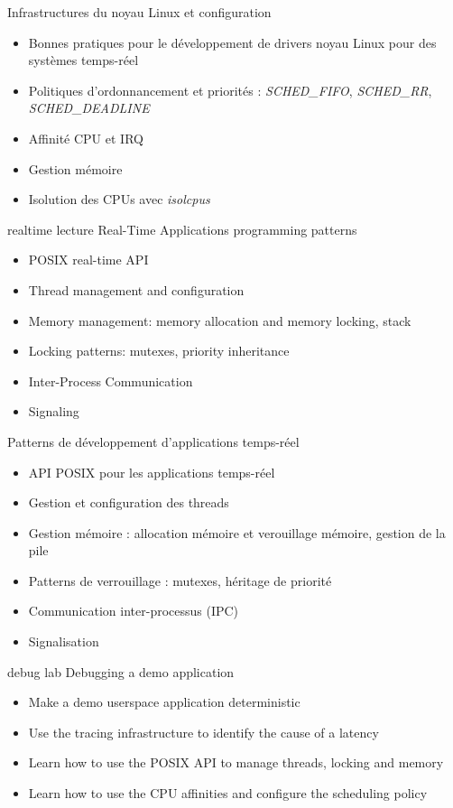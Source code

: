 {Infrastructures du noyau Linux et configuration}
{
  \begin{itemize}
  \item Bonnes pratiques pour le développement de drivers noyau Linux
    pour des systèmes temps-réel
  \item Politiques d'ordonnancement et priorités : {\em SCHED\_FIFO},
    {\em SCHED\_RR}, {\em SCHED\_DEADLINE}
  \item Affinité CPU et IRQ
  \item Gestion mémoire
  \item Isolution des CPUs avec {\em isolcpus}
  \end{itemize}
}
{realtime}
{lecture}
{Real-Time Applications programming patterns}
{
  \begin{itemize}
  \item POSIX real-time API
  \item Thread management and configuration
  \item Memory management: memory allocation and memory locking, stack
  \item Locking patterns: mutexes, priority inheritance
  \item Inter-Process Communication
  \item Signaling
  \end{itemize}
}
{Patterns de développement d'applications temps-réel}
{
  \begin{itemize}
  \item API POSIX pour les applications temps-réel
  \item Gestion et configuration des threads
  \item Gestion mémoire : allocation mémoire et verouillage mémoire, gestion de la pile
  \item Patterns de verrouillage : mutexes, héritage de priorité
  \item Communication inter-processus (IPC)
  \item Signalisation
  \end{itemize}
}
{debug}
{lab}
{Debugging a demo application}
{
  \begin{itemize}
  \item Make a demo userspace application deterministic
  \item Use the tracing infrastructure to identify the cause of a latency
  \item Learn how to use the POSIX API to manage threads, locking and memory
  \item Learn how to use the CPU affinities and configure the scheduling policy
  \end{itemize}
}
